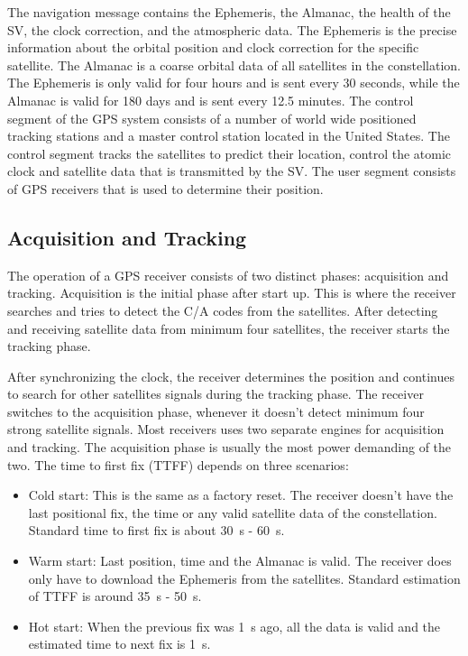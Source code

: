   
 
 The navigation message contains the Ephemeris, the Almanac, the health of the SV, the clock correction, and the atmospheric data. The Ephemeris is the precise information about the orbital position and clock correction for the specific satellite. The Almanac is a coarse orbital data of all satellites in the constellation. The Ephemeris is only valid for four hours and is sent every 30  seconds, while the Almanac is valid for 180 days and is sent every 12.5 minutes. 
 The control segment of the GPS system consists of a number of world wide positioned tracking stations and a master control station located in the United States. The control segment tracks the satellites to predict their location, control the atomic clock and satellite data that is transmitted by the SV. The user segment consists of GPS receivers that is used to determine their position.
  
  
 \subsection{Acquisition and Tracking}
  
The operation of a GPS receiver consists of two distinct phases: acquisition and tracking. Acquisition is the initial phase after start up. This is where the receiver searches and tries to detect the C/A codes from the satellites. After detecting and receiving satellite data from minimum four satellites, the receiver starts the tracking phase.

After synchronizing the clock, the receiver determines the position and continues to search for other satellites signals during the tracking phase. The receiver switches to the acquisition phase, whenever it doesn't detect minimum four strong satellite signals.
Most receivers uses two separate engines for acquisition and tracking. The acquisition phase is usually the most power demanding of the two. The time to first fix (TTFF) depends on three scenarios:
\begin{itemize}
\item Cold start: This is the same as a factory reset. The receiver doesn't have the last positional fix, the time or any valid satellite data of the constellation. Standard time to first fix  is about 30 \,s - 60 \,s.
\item Warm start: Last position, time and the Almanac is valid. The receiver does only have to download the Ephemeris from the satellites. Standard estimation of TTFF is around 35 \,s - 50 \,s.
\item Hot start: When the previous fix was 1 \,s ago, all the data is valid and the estimated time to next fix is 1 \,s. 

\end{itemize}




\newpage